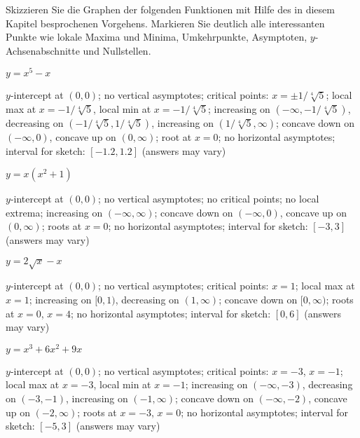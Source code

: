  
\begin{exercises}

\noindent Skizzieren Sie die Graphen der folgenden Funktionen mit Hilfe des in diesem Kapitel besprochenen Vorgehens. Markieren Sie deutlich alle interessanten Punkte wie lokale Maxima und Minima, Umkehrpunkte, Asymptoten, $y$-Achsenabschnitte und Nullstellen. 

\twocol


\begin{exercise} $y= x^5 - x$
\begin{answer}
$y$-intercept at $(0,0)$; no vertical asymptotes; critical points:
  $x=\pm1/\sqrt[4]{5}$; local max at $x=-1/\sqrt[4]{5}$, local min at
  $x=-1/\sqrt[4]{5}$; increasing on $(-\infty,-1/\sqrt[4]{5})$, decreasing
  on $(-1/\sqrt[4]{5},1/\sqrt[4]{5})$, increasing on
  $(1/\sqrt[4]{5},\infty)$; concave down on $(-\infty,0)$, concave up on
  $(0, \infty)$; root at $x=0$; no horizontal asymptotes; interval for
  sketch: $[-1.2,1.2]$ (answers may vary)
\end{answer}
\end{exercise}

\begin{exercise} $y=x(x^2+1)$
\begin{answer}
$y$-intercept at $(0,0)$; no vertical asymptotes; no critical points;
  no local extrema; increasing on $(-\infty,\infty)$; concave down on
  $(-\infty,0)$, concave up on $(0, \infty)$; roots at $x=0$; no
  horizontal asymptotes; interval for sketch: $[-3,3]$ (answers may
  vary)
\end{answer}
\end{exercise}

\begin{exercise} $y=2\sqrt{x} - x$
\begin{answer}
$y$-intercept at $(0,0)$; no vertical asymptotes; critical points: $x=
  1$; local max at $x=1$; increasing on $[0,1)$, decreasing on
    $(1,\infty)$; concave down on $[0,\infty)$; roots at $x=0$, $x=4$;
      no horizontal asymptotes; interval for sketch: $[0,6]$ (answers
      may vary)
\end{answer}
\end{exercise}

\begin{exercise} $y=x^3+6x^2 + 9x$
\begin{answer}
$y$-intercept at $(0,0)$; no vertical asymptotes; critical points:
  $x=-3$, $x= -1$; local max at $x=-3$, local min at $x=-1$;
  increasing on $(-\infty,-3)$, decreasing on $(-3,-1)$, increasing on
  $(-1,\infty)$; concave down on $(-\infty,-2)$, concave up on $(-2,
  \infty)$; roots at $x=-3$, $x=0$; no horizontal asymptotes; interval
  for sketch: $[-5,3]$ (answers may vary)
\end{answer}
\end{exercise}


\end{exercises}
